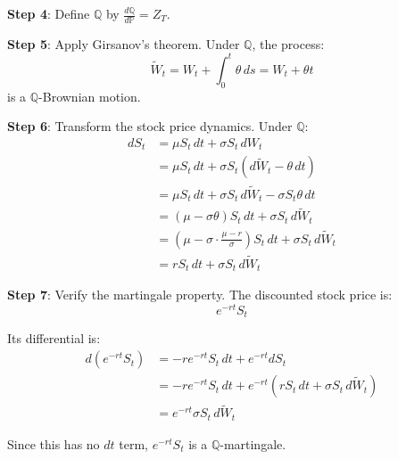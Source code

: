 \documentclass[
  letterpaper,
  DIV=11,
  numbers=noendperiod]{scrartcl}
\begin{document}
\begin{tcolorbox}
\textbf{Step 4}: Define \(\mathbb{Q}\) by
\(\frac{d\mathbb{Q}}{d\mathbb{P}} = Z_T\).

\textbf{Step 5}: Apply Girsanov's theorem. Under \(\mathbb{Q}\), the
process: \[\tilde{W}_t = W_t + \int_0^t \theta \, ds = W_t + \theta t\]
is a \(\mathbb{Q}\)-Brownian motion.

\textbf{Step 6}: Transform the stock price dynamics. Under
\(\mathbb{Q}\): \begin{align}
dS_t &= \mu S_t \, dt + \sigma S_t \, dW_t \\
&= \mu S_t \, dt + \sigma S_t (d\tilde{W}_t - \theta \, dt) \\
&= \mu S_t \, dt + \sigma S_t \, d\tilde{W}_t - \sigma S_t \theta \, dt \\
&= (\mu - \sigma\theta) S_t \, dt + \sigma S_t \, d\tilde{W}_t \\
&= \left(\mu - \sigma \cdot \frac{\mu - r}{\sigma}\right) S_t \, dt + \sigma S_t \, d\tilde{W}_t \\
&= r S_t \, dt + \sigma S_t \, d\tilde{W}_t
\end{align}

\textbf{Step 7}: Verify the martingale property. The discounted stock
price is: \[e^{-rt}S_t\]

Its differential is: \begin{align}
d(e^{-rt}S_t) &= -re^{-rt}S_t \, dt + e^{-rt} dS_t \\
&= -re^{-rt}S_t \, dt + e^{-rt}(rS_t \, dt + \sigma S_t \, d\tilde{W}_t) \\
&= e^{-rt}\sigma S_t \, d\tilde{W}_t
\end{align}

Since this has no \(dt\) term, \(e^{-rt}S_t\) is a
\(\mathbb{Q}\)-martingale.

\end{tcolorbox}
\end{document}
